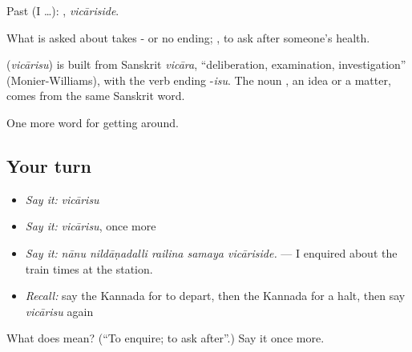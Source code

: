 Past (I …): , \emph{vicāriside}.

What is asked about takes - or no ending;  , to ask after someone's health.

\begin{cousinweb}
\textbf{} (\emph{vicārisu}) is built from Sanskrit \emph{vicāra}, \textquotedblleft{}deliberation, examination, investigation\textquotedblright{} (Monier-Williams), with the verb ending -\emph{isu}. The noun , an idea or a matter, comes from the same Sanskrit word.
\end{cousinweb}

\begin{grammarlens}[title={What you've built}]
One more word for getting around.
\end{grammarlens}

\subsection*{Your turn}
\begin{itemize}
\raggedright
  \item \emph{Say it:} \emph{vicārisu}
  \item \emph{Say it:} \emph{vicārisu}, once more
  \item \emph{Say it:} \emph{nānu nildāṇadalli railina samaya vicāriside.} — I enquired about the train times at the station.
  \item \emph{Recall:} say the Kannada for to depart, then the Kannada for a halt, then say \emph{vicārisu} again
\end{itemize}

\begin{tcolorbox}[breakable,colback=teal!4,colframe=teal!35!black,title={Before you move on}]
What does  mean? (\textquotedblleft{}To enquire; to ask after\textquotedblright{}.) Say it once more.
\end{tcolorbox}
